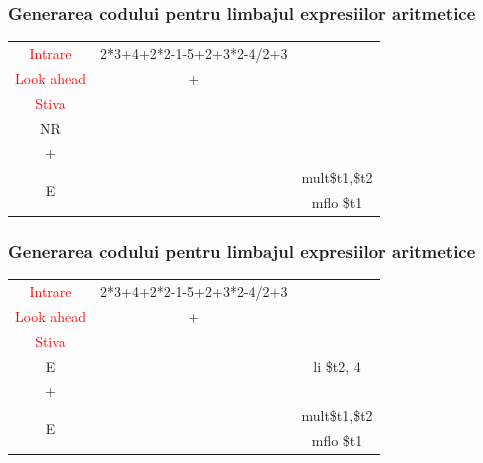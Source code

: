 \documentclass[pdf]{beamer}
\begin{document}
\begin{frame}
\frametitle{Generarea codului pentru limbajul expresiilor aritmetice}
\begin{center}
\begin{tabular}{cc|c|} \cline{1-2}
\multicolumn{1}{|c|}{\textcolor{red}{Intrare}} & {2*3+4+2*2-1-5+2+3*2-4/2+3} \\ \cline{1-2}
\multicolumn{1}{|c|}{\textcolor{red}{Look ahead}} & + \\ \cline{1-2}
\multicolumn{1}{|c|}{\textcolor{red}{Stiva}}  \\
\cline{1-1} \cline{3-3}
\multicolumn{1}{|c|}{NR} & & {}\\
\cline{1-1} \cline{3-3}
\multicolumn{1}{|c|}{+} & & {}\\
\cline{1-1} \cline{3-3}
\multicolumn{1}{|c|}{\multirow{2}{*}{E}} & & { mult\quad \$t1,\$t2 }\\
\multicolumn{1}{|c|}{} & & { mflo \quad \$t1} \\
\cline{1-1} \cline{3-3} 
\end{tabular}
\end{center}
\end{frame}



\begin{frame}
\frametitle{Generarea codului pentru limbajul expresiilor aritmetice}
\begin{center}
\begin{tabular}{cc|c|} \cline{1-2}
\multicolumn{1}{|c|}{\textcolor{red}{Intrare}} & {2*3+4+2*2-1-5+2+3*2-4/2+3} \\ \cline{1-2}
\multicolumn{1}{|c|}{\textcolor{red}{Look ahead}} & + \\ \cline{1-2}
\multicolumn{1}{|c|}{\textcolor{red}{Stiva}}  \\
\cline{1-1} \cline{3-3}
\multicolumn{1}{|c|}{E} & & {li \quad \$t2, 4}\\
\cline{1-1} \cline{3-3}
\multicolumn{1}{|c|}{+} & & {}\\
\cline{1-1} \cline{3-3}
\multicolumn{1}{|c|}{\multirow{2}{*}{E}} & & { mult\quad \$t1,\$t2 }\\
\multicolumn{1}{|c|}{} & & { mflo \quad \$t1} \\
\cline{1-1} \cline{3-3} 
\end{tabular}
\end{center}
\end{frame}
\end{document}
